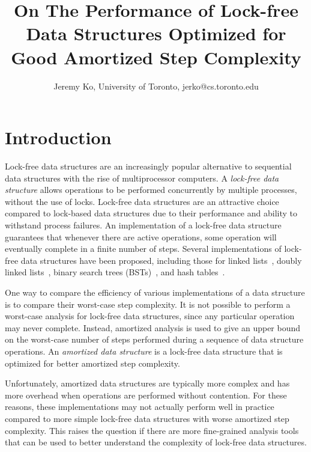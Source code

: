 \documentclass[letterpaper]{article}
\title{On The Performance of Lock-free Data Structures Optimized for Good Amortized Step Complexity}
\author{Jeremy Ko, University of Toronto, jerko@cs.toronto.edu}
\date{}
\begin{document}
\maketitle


\begin{abstract}
\end{abstract}


\section{Introduction}

Lock-free data structures are an increasingly popular alternative to sequential data structures with the rise of multiprocessor computers. A \textit{lock-free data structure} allows operations to be performed concurrently by multiple processes, without the use of locks. Lock-free data structures are an attractive choice compared to lock-based data structures due to their performance and ability to withstand process failures. An implementation of a lock-free data structure guarantees that whenever there are active operations, some operation will eventually complete in a finite number of steps. Several implementations of lock-free data structures have been proposed, including those for linked lists~\cite{Valois95, Harris01, FomitchevR04}, doubly linked lists~\cite{Shafiei15}, binary search trees (BSTs)~\cite{EllenFRB10, EllenFHR13, Ko18}, and hash tables~\cite{Michael02, ShalevS06, PurcellH05}.

One way to compare the efficiency of various implementations of a data structure is to compare their worst-case step complexity. It is not possible to perform a worst-case analysis for lock-free data structures, since any particular operation may never complete. Instead, amortized analysis is used to give an upper bound on the worst-case number of steps performed during a sequence of data structure operations. An \textit{amortized data structure} is a lock-free data structure that is optimized for better amortized step complexity.

Unfortunately, amortized data structures are typically more complex and has more overhead when operations are performed without contention. For these reasons, these implementations may not actually perform well in practice compared to more simple lock-free data structures with worse amortized step complexity. This raises the question if there are more fine-grained analysis tools that can be used to better understand the complexity of lock-free data structures.
\end{document}
